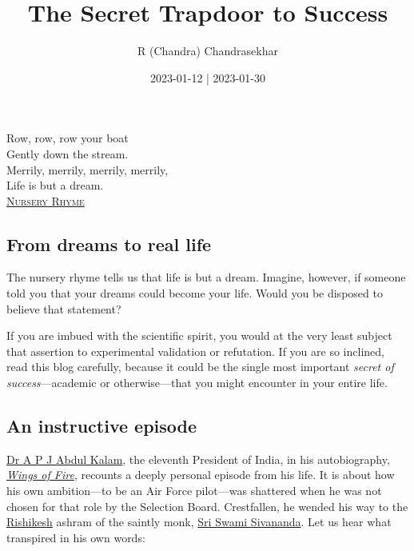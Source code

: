 \documentclass[
  a4paper,
]{article}
\title{The Secret Trapdoor to Success}
\author{R (Chandra) Chandrasekhar}
\date{2023-01-12 | 2023-01-30}
\begin{document}
\maketitle

\thispagestyle{empty}


\begin{flushright}

\begin{footnotesize}

Row, row, row your boat\\
Gently down the stream.\\
Merrily, merrily, merrily, merrily,\\
Life is but a dream.\\
\href{https://en.wikipedia.org/wiki/Row,_Row,_Row_Your_Boat}{\textsc{Nursery
Rhyme}}

\end{footnotesize}

\end{flushright}

\hypertarget{from-dreams-to-real-life}{%
\subsection{From dreams to real life}\label{from-dreams-to-real-life}}

The nursery rhyme tells us that life is but a dream. Imagine, however,
if someone told you that your dreams could become your life. Would you
be disposed to believe that statement?

If you are imbued with the scientific spirit, you would at the very
least subject that assertion to experimental validation or refutation.
If you are so inclined, read this blog carefully, because it could be
the single most important \emph{secret of success}---academic or
otherwise---that you might encounter in your entire life.

\hypertarget{an-instructive-episode}{%
\subsection{An instructive episode}\label{an-instructive-episode}}

\href{https://en.wikipedia.org/wiki/A._P._J._Abdul_Kalam}{Dr A P J Abdul
Kalam}, the eleventh President of India, in his autobiography,
\href{https://en.wikipedia.org/wiki/Wings_of_Fire_(autobiography)}{\emph{Wings
of Fire}}, recounts a deeply personal episode from his life. It is about
how his own ambition---to be an Air Force pilot---was shattered when he
was not chosen for that role by the Selection Board. Crestfallen, he
wended his way to the
\href{https://en.wikipedia.org/wiki/Rishikesh}{Rishikesh} ashram of the
saintly monk,
\href{https://en.wikipedia.org/wiki/Sivananda_Saraswati}{Sri Swami
Sivananda}. Let us hear what transpired in his own words:
\end{document}
